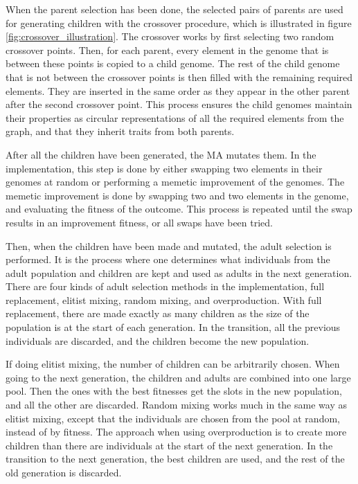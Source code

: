 When the parent selection has been done, the selected pairs of parents are used for generating children with the crossover procedure, which is illustrated in figure \ref{fig:crossover_illustration}. The crossover works by first selecting two random crossover points. Then, for each parent, every element in the genome that is between these points is copied to a child genome. The rest of the child genome that is not between the crossover points is then filled with the remaining required elements. They are inserted in the same order as they appear in the other parent after the second crossover point. This process ensures the child genomes maintain their properties as circular representations of all the required elements from the graph, and that they inherit traits from both parents.

After all the children have been generated, the MA mutates them. In the implementation, this step is done by either swapping two elements in their genomes at random or performing a memetic improvement of the genomes. The memetic improvement is done by swapping two and two elements in the genome, and evaluating the fitness of the outcome. This process is repeated until the swap results in an improvement fitness, or all swaps have been tried.

Then, when the children have been made and mutated, the adult selection is performed. It is the process where one determines what individuals from the adult population and children are kept and used as adults in the next generation. There are four kinds of adult selection methods in the implementation, full replacement, elitist mixing, random mixing, and overproduction. With full replacement, there are made exactly as many children as the size of the population is at the start of each generation. In the transition, all the previous individuals are discarded, and the children become the new population.

If doing elitist mixing, the number of children can be arbitrarily chosen. When going to the next generation, the children and adults are combined into one large pool. Then the ones with the best fitnesses get the slots in the new population, and all the other are discarded. Random mixing works much in the same way as elitist mixing, except that the individuals are chosen from the pool at random, instead of by fitness. The approach when using overproduction is to create more children than there are individuals at the start of the next generation. In the transition to the next generation, the best children are used, and the rest of the old generation is discarded.

